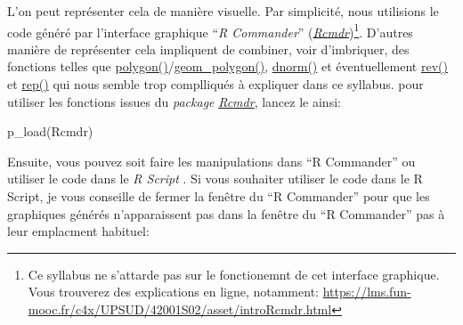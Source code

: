 \documentclass[
]{book}
\newenvironment{Shaded}{\begin{snugshade}}{\end{snugshade}}
\newcommand{\FunctionTok}[1]{\textcolor[rgb]{0.00,0.00,0.00}{#1}}
\newcommand{\NormalTok}[1]{#1}
\begin{document}
L'on peut représenter cela de manière visuelle. Par simplicité, nous utilisions le code généré par l'interface graphique ``\emph{R Commander}'' (\href{https://cran.r-project.org/web/packages/Rcmdr/index.html}{\emph{Rcmdr}})\footnote{Ce syllabus ne s'attarde pas sur le fonctionemnt de cet interface graphique. Vous trouverez des explications en ligne, notamment: \url{https://lms.fun-mooc.fr/c4x/UPSUD/42001S02/asset/introRcmdr.html}}. D'autres manière de représenter cela impliquent de combiner, voir d'imbriquer, des fonctions telles que \href{https://www.rdocumentation.org/packages/graphics/versions/3.6.2/topics/polygon}{polygon()}/\href{https://ggplot2.tidyverse.org/reference/geom_polygon.html}{geom\_polygon()}, \href{https://stat.ethz.ch/R-manual/R-devel/library/stats/html/Normal.html}{dnorm()} et éventuellement \href{https://www.rdocumentation.org/packages/base/versions/3.6.2/topics/rev}{rev()} et \href{https://www.rdocumentation.org/packages/base/versions/3.6.2/topics/rep}{rep()} qui nous semble trop complliqués à expliquer dans ce syllabus. pour utiliser les fonctions issues du \emph{package} \href{https://cran.r-project.org/web/packages/Rcmdr/index.html}{\emph{Rcmdr}}, lancez le ainsi:

\begin{Shaded}
\begin{Highlighting}[]
\FunctionTok{p\_load}\NormalTok{(Rcmdr)}
\end{Highlighting}
\end{Shaded}

Ensuite, vous pouvez soit faire les manipulations dans ``R Commander'' ou utiliser le code dans le \emph{R Script }. Si vous souhaiter utiliser le code dans le R Script, je vous conseille de fermer la fenêtre du ``R Commander'' pour que les graphiques générés n'apparaissent pas dans la fenêtre du ``R Commander'' pas à leur emplacment habituel:
\end{document}
